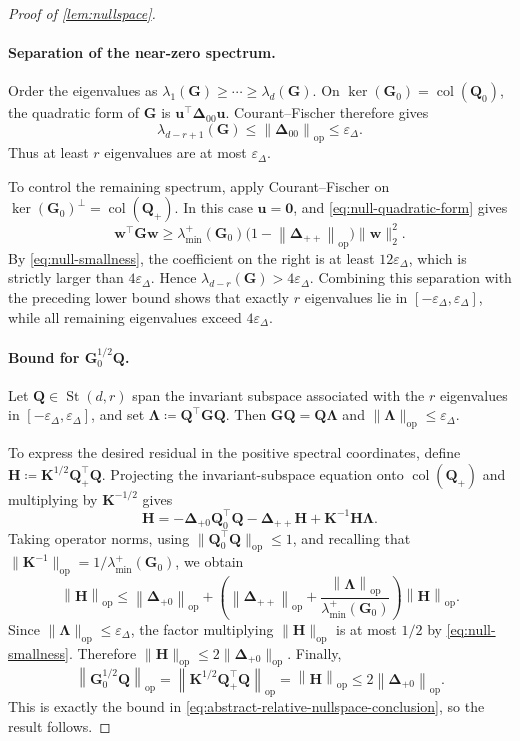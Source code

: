 \documentclass[10pt,a4paper]{amsart}
\DeclareMathOperator{\St}{St}
\newcommand{\bze}{\bm{0}}
\DeclareMathOperator{\col}{col}
\newcommand{\opn}[1]{\left\lVert #1\right\rVert_{\mathrm{op}}}
\newcommand{\trans}{\top}
\begin{document}
\begin{proof}[Proof of \cref{lem:nullspace}]
\paragraph{Separation of the near-zero spectrum.}
Order the eigenvalues as
$\lambda_1(\bm G)\ge\cdots\ge\lambda_d(\bm G)$.
On $\ker(\bm G_0)=\col(\bm Q_0)$, the quadratic form of $\bm G$ is
$\bm u^\trans\bm\Delta_{00}\bm u$.  Courant--Fischer therefore gives
\[
  \lambda_{d-r+1}(\bm G)
  \le
  \opn{\bm\Delta_{00}}
  \le
  \varepsilon_\Delta.
\]
Thus at least $r$ eigenvalues are at most $\varepsilon_\Delta$.

To control the remaining spectrum, apply Courant--Fischer on
$\ker(\bm G_0)^\perp=\col(\bm Q_+)$.  In this case $\bm u=\bze$, and
\cref{eq:null-quadratic-form} gives
\[
  \bm w^\trans\bm G\bm w
  \ge
  \lambda_{\min}^{+}(\bm G_0)
  \bigl(
    1-\opn{\bm\Delta_{++}}
  \bigr)
  \|\bm w\|_2^2.
\]
By \cref{eq:null-smallness}, the coefficient on the right is at least
$12\varepsilon_\Delta$, which is strictly larger than
$4\varepsilon_\Delta$.  Hence
$\lambda_{d-r}(\bm G)>4\varepsilon_\Delta$.
Combining this separation with the preceding lower bound shows that exactly
$r$ eigenvalues lie in $[-\varepsilon_\Delta,\varepsilon_\Delta]$, while all remaining eigenvalues
exceed $4\varepsilon_\Delta$.

\paragraph{Bound for $\bm G_0^{1/2}\bm Q$.}
Let $\bm Q\in\St(d,r)$ span the invariant subspace associated with
the $r$ eigenvalues in $[-\varepsilon_\Delta,\varepsilon_\Delta]$, and set
$\bm\Lambda\coloneqq\bm Q^\trans\bm G\bm Q$.
Then $\bm G\bm Q=\bm Q\bm\Lambda$ and
$\|\bm\Lambda\|_{\mathrm{op}}\le \varepsilon_\Delta$.

To express the desired residual in the positive spectral coordinates, define
$\bm H\coloneqq\bm K^{1/2}\bm Q_+^\trans\bm Q$.
Projecting the invariant-subspace equation onto $\col(\bm Q_+)$ and
multiplying by $\bm K^{-1/2}$ gives
\begin{equation}
\label{eq:nullspace-H-equation}
  \bm H
  =
  -\bm\Delta_{+0}\bm Q_0^\trans\bm Q
  -\bm\Delta_{++}\bm H
  +\bm K^{-1}\bm H\bm\Lambda.
\end{equation}
Taking operator norms, using
$\|\bm Q_0^\trans\bm Q\|_{\mathrm{op}}\le1$, and recalling that
$\|\bm K^{-1}\|_{\mathrm{op}}
=1/\lambda_{\min}^{+}(\bm G_0)$, we obtain
\[
  \opn{\bm H}
  \le
  \opn{\bm\Delta_{+0}}
  +
  \left(
    \opn{\bm\Delta_{++}}
    +
    \frac{\opn{\bm\Lambda}}
         {\lambda_{\min}^{+}(\bm G_0)}
  \right)
  \opn{\bm H}.
\]
Since $\|\bm\Lambda\|_{\mathrm{op}}\le \varepsilon_\Delta$, the factor multiplying
$\|\bm H\|_{\mathrm{op}}$ is at most $1/2$ by
\cref{eq:null-smallness}.  Therefore
$\|\bm H\|_{\mathrm{op}}
\le2\|\bm\Delta_{+0}\|_{\mathrm{op}}$.
Finally,
\[
  \opn{\bm G_0^{1/2}\bm Q}
  =
  \opn{\bm K^{1/2}\bm Q_+^\trans\bm Q}
  =
  \opn{\bm H}
  \le
  2\opn{\bm\Delta_{+0}}.
\]
This is exactly the bound in
\cref{eq:abstract-relative-nullspace-conclusion}, so the result follows.
\end{proof}
\end{document}
